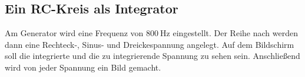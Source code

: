 \subsection{Ein RC-Kreis als Integrator} %
\label{sub:Integrator_durch}
Am Generator wird eine Frequenz von $\qty{800}{\hertz}$ eingestellt.
Der Reihe nach werden dann eine Rechteck-, Sinus- und Dreickespannung angelegt.
Auf dem Bildschirm soll die integrierte und die zu integrierende Spannung zu sehen sein.
Anschließend wird von jeder Spannung ein Bild gemacht.

